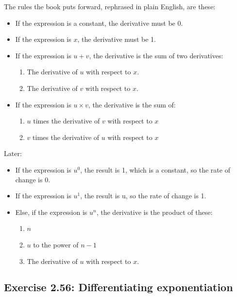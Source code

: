 \documentclass[final,fleqn,titlepage,twoside]{article}
\begin{document}
The rules the book puts forward, rephrased in plain English, are these:

\begin{itemize}
\item If the expression is a constant, the derivative must be 0.
\item If the expression is \(x\), the derivative must be 1.
\item If the expression is \(u + v\), the derivative is the sum of two
derivatives:
\begin{enumerate}
\item The derivative of \(u\) with respect to \(x\).
\item The derivative of \(v\) with respect to \(x\).
\end{enumerate}
\item If the expression is \(u \times v\), the derivative is the sum of:
\begin{enumerate}
\item \(u\) times the derivative of \(v\) with respect to \(x\)
\item \(v\) times the derivative of \(u\) with respect to \(x\)
\end{enumerate}
\end{itemize}

Later:
\begin{itemize}
\item If the expression is \(u^0\), the result is 1, which is a constant, so the
rate of change is 0.
\item If the expression is \(u^1\), the result is u, so the rate of change is 1.
\item Else, if the expression is \(u^n\), the derivative is the product of these:
\begin{enumerate}
\item \(n\)
\item \(u\) to the power of \(n-1\)
\item The derivative of \(u\) with respect to \(x\).
\end{enumerate}
\end{itemize}

\subsection{Exercise 2.56: Differentiating exponentiation}
\label{sec:org30ff1f7}
\end{document}
